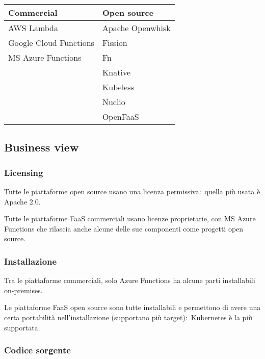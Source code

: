 \begin{table}[H]
	\centering
	\begin{tabular}{|l|l|}
		\hline
		\textbf{Commercial}    & \textbf{Open source} \\\hline\hline
		AWS Lambda             & Apache Openwhisk     \\
		Google Cloud Functions & Fission              \\
		MS Azure Functions     & Fn                   \\
		                       & Knative              \\
		                       & Kubeless             \\
		                       & Nuclio               \\
		                       & OpenFaaS             \\\hline
	\end{tabular}
\end{table}

\subsection{Business view}

\subsubsection{Licensing}

Tutte le piattaforme open source usano una licenza permissiva:\ quella più usata è Apache 2.0.\

Tutte le piattaforme FaaS commerciali usano licenze proprietarie, con MS Azure Functions che rilascia anche alcune delle sue componenti come progetti open source.\

\subsubsection{Installazione}

Tra le piattaforme commerciali, solo Azure Functions ha alcune parti installabili on-premises.\

Le piattaforme FaaS open source sono tutte installabili e permettono di avere una certa portabilità nell'installazione (supportano più target):\ Kubernetes è la più supportata.\

\subsubsection{Codice sorgente}

